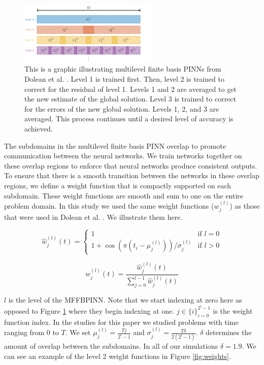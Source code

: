 \documentclass[12pt]{article}
\begin{document}
\begin{figure}[t]
\center
\includegraphics[width = 0.6\textwidth]{imgs/domain_decomp2}
\caption{This is a graphic illustrating multilevel finite basis PINNs from Dolean et al. \cite{fbpinns}.  Level 1 is trained first. Then, level 2 is trained to correct for the residual of level 1. Levels 1 and 2 are averaged to get the new estimate of the global solution. Level 3 is trained to correct for the errors of the new global solution. Levels 1, 2, and 3 are averaged. This process continues until a desired level of accuracy is achieved.}
\label{fig:fbpinn}
\end{figure} 

\par The subdomains in the multilevel finite basis PINN overlap to promote communication between the neural networks. We train networks together on these overlap regions to enforce that neural networks produce consistent outputs. To ensure that there is a smooth transition between the networks in these overlap regions, we define a weight function that is compactly supported on each subdomain. These weight functions are smooth and sum to one on the entire problem domain. In this study we used the same weight functions ($w_{j}^{(l)}$) as those that were used in Dolean et al. \cite{fbpinns}. We illustrate them here.

\begin{equation}
\hat{w}_j^{(l)}(t) =
    \begin{cases}
        1 & \text{if } l = 0\\
        1 + \cos(\pi(t_i - \mu_{j}^{(l)}))/\sigma_{j}^{(l)}& \text{if } l>0
    \end{cases}
\end{equation}

\begin{equation}
w_j^{(l)}(t) = \frac{\hat{w}_j^{(l)}(t)}{\sum_{j=0}^{l-1} \hat{w}_j^{(l)}(t)}
\end{equation}

\par  $l$ is the level of the MFFBPINN. Note that we start indexing at zero here as opposed to Figure \ref{fig:fbpinn} where they begin indexing at one. $j \in \{i\}_{i=0}^{2^l-1}$ is the weight function index. In the studies for this paper we studied problems with time ranging from $0$ to $T$. We set $\mu_{j}^{(l)} = \frac{Tj}{2^l-1}$ and $\sigma_{j}^{(l)} = \frac{T\delta}{2(2^l-1)}$. $\delta$ determines the amount of overlap between the subdomains. In all of our simulations $\delta = 1.9$. We can see an example of the level 2 weight functions in Figure \ref{fig:weights}.
\end{document}
